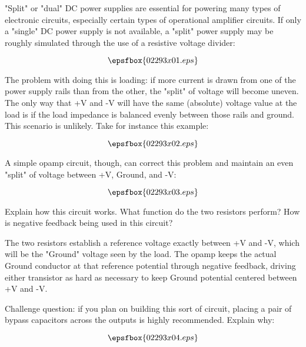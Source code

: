 

"Split" or "dual" DC power supplies are essential for powering many types of electronic circuits, especially certain types of operational amplifier circuits.  If only a "single" DC power supply is not available, a "split" power supply may be roughly simulated through the use of a resistive voltage divider:

$$\epsfbox{02293x01.eps}$$

The problem with doing this is loading: if more current is drawn from one of the power supply rails than from the other, the "split" of voltage will become uneven.  The only way that +V and -V will have the same (absolute) voltage value at the load is if the load impedance is balanced evenly between those rails and ground.  This scenario is unlikely.  Take for instance this example:

$$\epsfbox{02293x02.eps}$$

A simple opamp circuit, though, can correct this problem and maintain an even "split" of voltage between +V, Ground, and -V:

$$\epsfbox{02293x03.eps}$$

Explain how this circuit works.  What function do the two resistors perform?  How is negative feedback being used in this circuit?







The two resistors establish a reference voltage exactly between +V and -V, which will be the "Ground" voltage seen by the load.  The opamp keeps the actual Ground conductor at that reference potential through negative feedback, driving either transistor as hard as necessary to keep Ground potential centered between +V and -V.

\vskip 10pt

Challenge question: if you plan on building this sort of circuit, placing a pair of bypass capacitors across the outputs is highly recommended.  Explain why:

$$\epsfbox{02293x04.eps}$$






